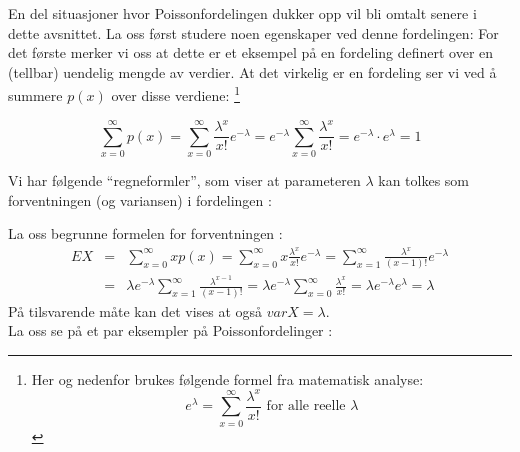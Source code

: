 \noindent En del situasjoner hvor Poissonfordelingen dukker opp vil bli
omtalt senere i dette avsnittet. La oss først studere noen
egenskaper ved denne fordelingen: For det første merker vi oss at
dette er et eksempel på en fordeling definert over en (tellbar)
uendelig mengde av verdier. At det virkelig er en fordeling ser
vi ved å summere $p(x)$ over disse verdiene:
\footnote{Her og nedenfor brukes følgende formel fra matematisk analyse: 
\[ e^{\lambda}=\sum_{x=0}^\infty \frac{{\lambda}^x}{x!}
        \mbox{\ \ \ for alle reelle $\lambda$} \]}

\[ \sum_{x=0}^\infty p(x)=\sum_{x=0}^\infty \frac{{\lambda}^x}{x!}e^{-\lambda}
        =e^{-\lambda} \sum_{x=0}^\infty \frac{{\lambda}^x}{x!}
        =e^{-\lambda} \cdot e^{\lambda} = 1 \]

\noindent Vi har følgende ``regneformler'', som viser at parameteren
 $\lambda$ kan tolkes som  forventningen (og variansen) i fordelingen :

\begin{center}  \end{center}

\noindent La oss begrunne formelen for forventningen :
\begin{eqnarray*}
 EX&=&\sum_{x=0}^\infty xp(x)
       =\sum_{x=0}^\infty x\frac{{\lambda}^x}{x!}e^{-\lambda}
       =\sum_{x=1}^\infty \frac{{\lambda}^x}{(x-1)!}e^{-\lambda} \\
   &=&\lambda e^{-\lambda}\sum_{x=1}^\infty \frac{{\lambda}^{x-1}}{(x-1)!}
       =\lambda e^{-\lambda}\sum_{x=0}^\infty \frac{{\lambda}^x}{x!}
       =\lambda e^{-\lambda}e^{\lambda}=\lambda
\end{eqnarray*}
\noindent  På tilsvarende måte kan det vises at også 
$varX=\lambda$. \\

La oss se på et par eksempler på Poissonfordelinger : \\ 

